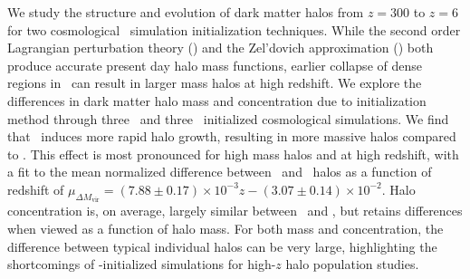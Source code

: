 
%
%
%
%


We study the structure and evolution of dark matter halos from $z = 300$ to $z = 6$ for two cosmological \nbody\ simulation initialization techniques.  While the second order Lagrangian perturbation theory (\lpt) and the Zel'dovich approximation (\za) both produce accurate present day halo mass functions, earlier collapse of dense regions in \lpt\ can result in larger mass halos at high redshift.  We explore the differences in dark matter halo mass and concentration due to initialization method through three \lpt\ and three \za\ initialized cosmological simulations.  We find that \lpt\ induces more rapid halo growth, resulting in more massive halos compared to \za.  This effect is most pronounced for high mass halos and at high redshift, with a fit to the mean normalized difference between \lpt\ and \za\ halos as a function of redshift of $\mu_{\Delta M_{\mathrm{vir}}} = (7.88 \pm 0.17) \times 10^{-3} z - (3.07 \pm 0.14) \times 10^{-2}$.  Halo concentration is, on average, largely similar between \lpt\ and \za, but retains differences when viewed as a function of halo mass.  For both mass and concentration, the difference between typical individual halos can be very large, highlighting the shortcomings of \za-initialized simulations for high-$z$ halo population studies.




